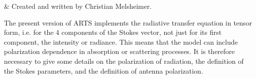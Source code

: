 %
%
 \label{sec:polarization}

%
%
 & Created and written by Christian Melsheimer.\\
\stophistory


%
%


\newcommand{\ColVct}[3]{\left( \begin{array}{c}
                                   #1 \\ #2 \\ #3
                               \end{array} \right) }
\newcommand{\PrtDrv}[2]{\frac{\partial #1}{\partial #2}}
\newcommand{\half} {\ensuremath{\textstyle\frac{1}{2}}}
\newcommand{\eVrt} {\ensuremath{\VctStl{e}_v}}
\newcommand{\eHor} {\ensuremath{\VctStl{e}_h}}
\newcommand{\eLh} {\ensuremath{\VctStl{e}_{LH}}}
\newcommand{\eRh} {\ensuremath{\VctStl{e}_{RH}}}
\newcommand{\ePls} {\ensuremath{\VctStl{e}_{+45\degree}}}
\newcommand{\eMin} {\ensuremath{\VctStl{e}_{-45\degree}}}
\newcommand{\mi}  {\ensuremath{\mathrm{i}}}


The present version of ARTS implements the radiative transfer equation
in tensor form, i.e. for the 4 components of the Stokes vector, not
just for its first component, the intensity or radiance.
This means that the model can include polarization dependence in
absorption or scattering processes.
It is therefore necessary to give some details on the polarization of
radiation, the definition of
the Stokes parameters, and the definition of antenna polarization.

